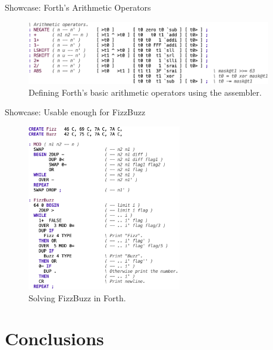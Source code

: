 \documentclass[presentation, bigger]{beamer}
\begin{document}
\begin{frame}[label={sec:orgae2f9ef}]{Showcase: Forth's Arithmetic Operators}
\begin{figure}[htbp]
\centering
\includegraphics[width=0.95\textwidth]{img/presentation/forth-arithmetic.png}
\caption{Defining Forth's basic arithmetic operators using the assembler.}
\end{figure}
\end{frame}

\begin{frame}[label={sec:org8a4d2e5}]{Showcase: Usable enough for FizzBuzz}
\begin{figure}[htbp]
\centering
\includegraphics[width=0.60\textwidth]{img/presentation/forth-fizz-buzz.png}
\caption{Solving FizzBuzz in Forth.}
\end{figure}
\end{frame}


\section{Conclusions}
\label{sec:org489dbe3}
\end{document}
